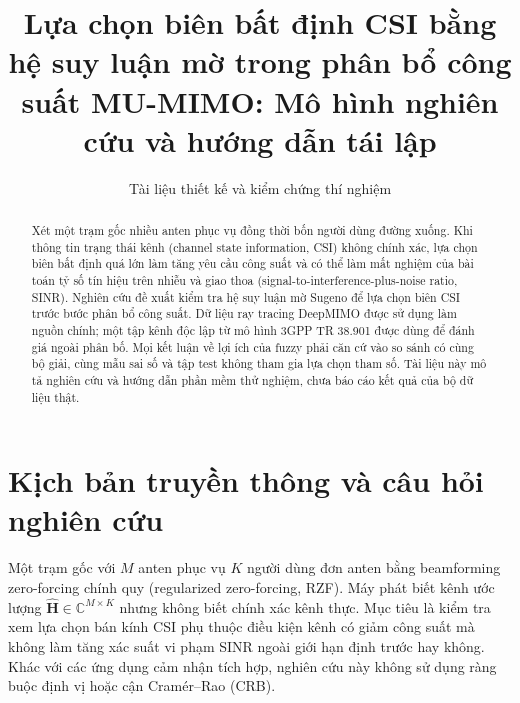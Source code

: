 \documentclass[11pt,onecolumn]{IEEEtran}
\title{Lựa chọn biên bất định CSI bằng hệ suy luận mờ trong phân bổ công suất MU-MIMO: Mô hình nghiên cứu và hướng dẫn tái lập}
\author{Tài liệu thiết kế và kiểm chứng thí nghiệm}
\begin{document}
\maketitle
\begin{abstract}
Xét một trạm gốc nhiều anten phục vụ đồng thời bốn người dùng đường xuống. Khi thông tin trạng thái kênh (channel state information, CSI) không chính xác, lựa chọn biên bất định quá lớn làm tăng yêu cầu công suất và có thể làm mất nghiệm của bài toán tỷ số tín hiệu trên nhiễu và giao thoa (signal-to-interference-plus-noise ratio, SINR). Nghiên cứu đề xuất kiểm tra hệ suy luận mờ Sugeno để lựa chọn biên CSI trước bước phân bổ công suất. Dữ liệu ray tracing DeepMIMO được sử dụng làm nguồn chính; một tập kênh độc lập từ mô hình 3GPP TR 38.901 được dùng để đánh giá ngoài phân bố. Mọi kết luận về lợi ích của fuzzy phải căn cứ vào so sánh có cùng bộ giải, cùng mẫu sai số và tập test không tham gia lựa chọn tham số. Tài liệu này mô tả nghiên cứu và hướng dẫn phần mềm thử nghiệm, chưa báo cáo kết quả của bộ dữ liệu thật.
\end{abstract}
\section{Kịch bản truyền thông và câu hỏi nghiên cứu}
Một trạm gốc với $M$ anten phục vụ $K$ người dùng đơn anten bằng beamforming zero-forcing chính quy (regularized zero-forcing, RZF). Máy phát biết kênh ước lượng $\widehat{\mathbf H}\in\mathbb C^{M\times K}$ nhưng không biết chính xác kênh thực. Mục tiêu là kiểm tra xem lựa chọn bán kính CSI phụ thuộc điều kiện kênh có giảm công suất mà không làm tăng xác suất vi phạm SINR ngoài giới hạn định trước hay không. Khác với các ứng dụng cảm nhận tích hợp, nghiên cứu này không sử dụng ràng buộc định vị hoặc cận Cramér--Rao (CRB).
\end{document}
